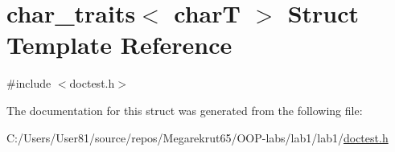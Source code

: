 \hypertarget{structchar__traits}{}\section{char\+\_\+traits$<$ charT $>$ Struct Template Reference}
\label{structchar__traits}


{\ttfamily \#include $<$doctest.\+h$>$}



The documentation for this struct was generated from the following file\+:\begin{DoxyCompactItemize}
\item 
C\+:/\+Users/\+User81/source/repos/\+Megarekrut65/\+O\+O\+P-\/labs/lab1/lab1/\mbox{\hyperlink{doctest_8h}{doctest.\+h}}\end{DoxyCompactItemize}
